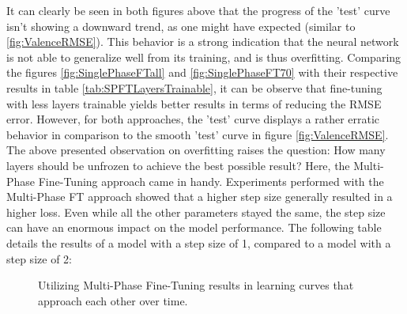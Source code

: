 It can clearly be seen in both figures above that the progress of the 'test' curve isn't showing a downward trend, as one might have expected (similar to  \ref{fig:ValenceRMSE}). This behavior is a strong indication that the neural network is not able to generalize well from its training, and is thus overfitting.
\newline\newline
Comparing the figures \ref{fig:SinglePhaseFTall} and \ref{fig:SinglePhaseFT70} with their respective results in table \ref{tab:SPFTLayersTrainable}, it can be observe that fine-tuning with less layers trainable yields better results in terms of reducing the RMSE error. However, for both approaches, the 'test' curve displays a rather erratic behavior in comparison to the smooth 'test' curve in figure \ref{fig:ValenceRMSE}. 
\newline\newline
The above presented observation on overfitting raises the question: How many layers should be unfrozen to achieve the best possible result? \newline
Here, the Multi-Phase Fine-Tuning approach came in handy. Experiments performed with the Multi-Phase FT approach showed that a higher step size generally resulted in a higher loss. Even while all the other parameters stayed the same, the step size can have an enormous impact on the model performance. The following table details the results of a model with a step size of 1, compared to a model with a step size of 2:

\begin{figure}[H]
  \centering
  \hfill
  \caption{Utilizing Multi-Phase Fine-Tuning results in learning curves that approach each other over time.}
\end{figure}

